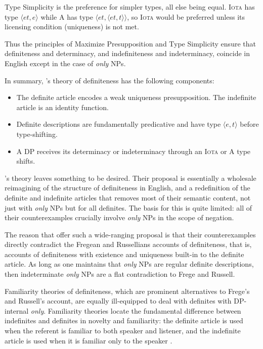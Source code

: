 Type Simplicity is the preference for simpler types, all else being equal. \textsc{Iota} has type $\langle et, e \rangle$ while \textsc{A} has type $\langle et, \langle et, t \rangle \rangle$, so \textsc{Iota} would be preferred unless its licensing condition (uniqueness) is not met.

Thus the principles of Maximize Presupposition and Type Simplicity ensure that definiteness and determinacy, and indefiniteness and indeterminacy, coincide in English except in the case of \textit{only} NPs.

In summary, \citeauthor{cb2015}'s theory of definiteness has the following components:

\begin{itemize}
	\item The definite article encodes a weak uniqueness presupposition. The indefinite article is an identity function.
	\item Definite descriptions are fundamentally predicative and have type $\langle e, t \rangle$ before type-shifting.
	\item A DP receives its determinacy or indeterminacy through an \textsc{Iota} or \textsc{A} type shifts.
\end{itemize}

\citeauthor{cb2015}'s theory leaves something to be desired. Their proposal is essentially a wholesale reimagining of the structure of definiteness in English, and a redefinition of the definite and indefinite articles that removes most of their semantic content, not just with \textit{only} NPs but for all definites. The basis for this is quite limited: all of their counterexamples crucially involve \textit{only} NPs in the scope of negation.

The reason that \citeauthor{cb2015} offer such a wide-ranging proposal is that their counterexamples directly contradict the Fregean and Russellians accounts of definiteness, that is, accounts of definiteness with existence and uniqueness built-in to the definite article. As long as one maintains that \textit{only} NPs are regular definite descriptions, then indeterminate \textit{only} NPs are a flat contradiction to Frege and Russell.

Familiarity theories of definiteness, which are prominent alternatives to Frege's and Russell's account, are equally ill-equipped to deal with definites with DP-internal \textit{only}. Familiarity theories locate the fundamental difference between indefinites and definites in novelty and familiarity: the definite article is used when the referent is familiar to both speaker and listener, and the indefinite article is used when it is familiar only to the speaker \citep{heim82}.

